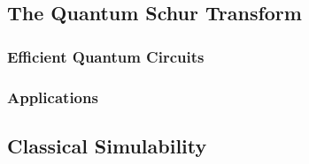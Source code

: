 \subsection{The Quantum Schur Transform}

\subsubsection{Efficient Quantum Circuits}

\subsubsection{Applications}

\subsection{Classical Simulability}